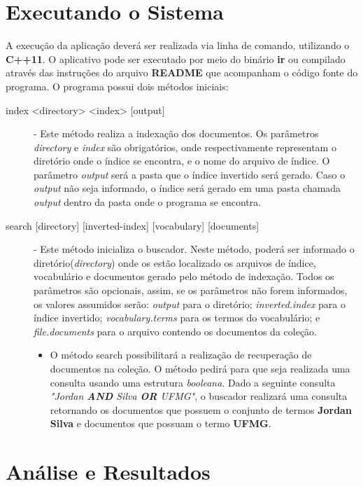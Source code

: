 \documentclass[12pt]{article}
\begin{document}
\section{Executando o Sistema} \label{sec:how-to-execute}

A execução da aplicação deverá ser realizada via linha de comando, utilizando o \textbf{C++11}. O aplicativo pode ser executado por meio do binário \textbf{ir} ou compilado através das instruções do arquivo \textbf{README} que acompanham o código fonte do programa. O programa possui dois métodos iniciais:
\begin{description}
\item[index <directory> <index> {[output]}] - Este método realiza a indexação dos documentos. Os parâmetros \textit{directory} e \textit{index} são obrigatórios, onde respectivamente representam o diretório onde o índice se encontra, e o nome do arquivo de índice. O parâmetro \textit{output} será a pasta que o índice invertido será gerado. Caso o \textit{output} não seja informado, o índice será gerado em uma pasta chamada \textit{output} dentro da pasta onde o programa se encontra.
\item[search {[directory]} {[inverted-index]} {[vocabulary]} {[documents]}] - Este método inicializa o buscador. Neste método, poderá ser informado o diretório(\textit{directory}) onde os estão localizado os arquivos de índice, vocabulário e documentos gerado pelo método de indexação. Todos os parâmetros são opcionais, assim, se os parâmetros não forem informados, os valores assumidos serão: \textit{output} para o diretório; \textit{inverted.index} para o índice invertido; \textit{vocabulary.terms} para os termos do vocabulário; e \textit{file.documents} para o arquivo contendo os documentos da coleção.
  \begin{itemize}
  \item O método search possibilitará a realização de recuperação de documentos na coleção. O método pedirá para que seja realizada uma consulta usando uma estrutura \textit{booleana}. Dado a seguinte consulta \textit{"Jordan \textbf{AND} Silva \textbf{OR} UFMG"}, o buscador realizará uma consulta retornando os documentos que possuem o conjunto de termos \textbf{Jordan Silva} e documentos que possuam o termo \textbf{UFMG}.
  \end{itemize}
\end{description}

\section{Análise e Resultados} \label{sec:analysis}
\end{document}

